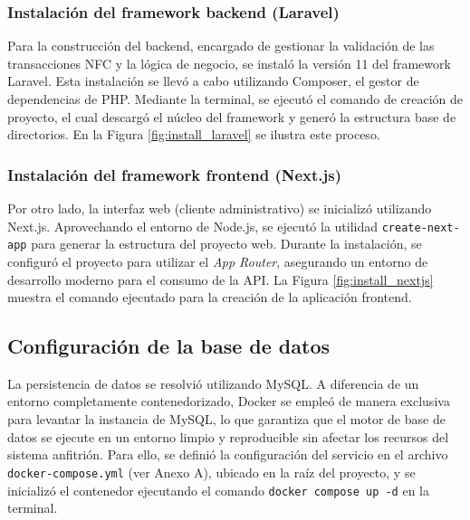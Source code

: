 \documentclass[12pt,letterpaper]{report}
\begin{document}
	\subsubsection{Instalación del framework backend (Laravel)} 
	Para la construcción del backend, encargado de gestionar la validación de las transacciones NFC y la lógica de negocio, se instaló la versión 11 del framework Laravel. Esta instalación se llevó a cabo utilizando Composer, el gestor de dependencias de PHP. Mediante la terminal, se ejecutó el comando de creación de proyecto, el cual descargó el núcleo del framework y generó la estructura base de directorios. En la Figura \ref{fig:install_laravel} se ilustra este proceso.
	
	
	\subsubsection{Instalación del framework frontend (Next.js)} 
	Por otro lado, la interfaz web (cliente administrativo) se inicializó utilizando Next.js. Aprovechando el entorno de Node.js, se ejecutó la utilidad \texttt{create-next-app} para generar la estructura del proyecto web. Durante la instalación, se configuró el proyecto para utilizar el \textit{App Router}, asegurando un entorno de desarrollo moderno para el consumo de la API. La Figura \ref{fig:install_nextjs} muestra el comando ejecutado para la creación de la aplicación frontend.
	
	
	
	
	
	\subsection{Configuración de la base de datos} 
	La persistencia de datos se resolvió utilizando MySQL. A diferencia de un entorno completamente contenedorizado, Docker se empleó de manera exclusiva para levantar la instancia de MySQL, lo que garantiza que el motor de base de datos se ejecute en un entorno limpio y reproducible sin afectar los recursos del sistema anfitrión. Para ello, se definió la configuración del servicio en el archivo \texttt{docker-compose.yml} (ver Anexo A), ubicado en la raíz del proyecto, y se inicializó el contenedor ejecutando el comando \texttt{docker compose up -d} en la terminal.
	
\end{document}
